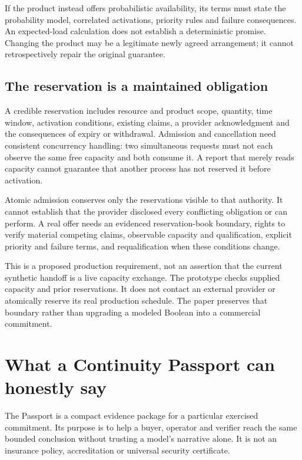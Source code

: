 \documentclass[11pt,a4paper]{article}
\begin{document}
If the product instead offers probabilistic availability, its terms must state the probability model, correlated activations, priority rules and failure consequences. An expected-load calculation does not establish a deterministic promise. Changing the product may be a legitimate newly agreed arrangement; it cannot retrospectively repair the original guarantee.

\subsection{The reservation is a maintained obligation}
A credible reservation includes resource and product scope, quantity, time window, activation conditions, existing claims, a provider acknowledgment and the consequences of expiry or withdrawal. Admission and cancellation need consistent concurrency handling: two simultaneous requests must not each observe the same free capacity and both consume it. A report that merely reads capacity cannot guarantee that another process has not reserved it before activation.

Atomic admission conserves only the reservations visible to that authority. It cannot establish that the provider disclosed every conflicting obligation or can perform. A real offer needs an evidenced reservation-book boundary, rights to verify material competing claims, observable capacity and qualification, explicit priority and failure terms, and requalification when these conditions change.

This is a proposed production requirement, not an assertion that the current synthetic handoff is a live capacity exchange. The prototype checks supplied capacity and prior reservations. It does not contact an external provider or atomically reserve its real production schedule. The paper preserves that boundary rather than upgrading a modeled Boolean into a commercial commitment.

\section{What a Continuity Passport can honestly say}\label{sec:passport}
The Passport is a compact evidence package for a particular exercised commitment. Its purpose is to help a buyer, operator and verifier reach the same bounded conclusion without trusting a model's narrative alone. It is not an insurance policy, accreditation or universal security certificate.
\end{document}
